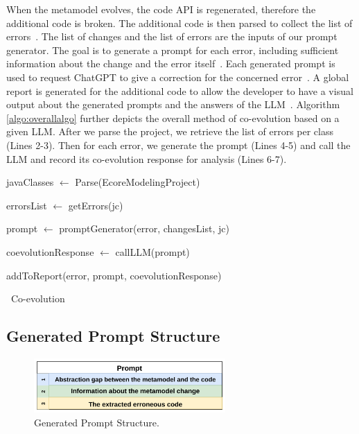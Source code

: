 When the metamodel evolves, the code API is regenerated, therefore the additional code is broken. The additional code is then parsed to collect the list of errors~. The list of changes and the list of errors are the inputs of our prompt generator. The goal is to generate a prompt for each error, including sufficient information about the change and the error itself~.
Each generated prompt is used to request ChatGPT to give a correction for the concerned error~. A global report is generated for the additional code to allow the developer to have a visual output about the generated prompts and the answers of the LLM~. Algorithm \ref{algo:overallalgo} further depicts the overall method of co-evolution based on a given LLM. After we parse the project, we retrieve the list of errors per class (Lines 2-3). Then for each error, we generate the prompt (Lines 4-5) and call the LLM and record its co-evolution response for analysis (Lines 6-7).


\begin{algorithm2e}[t]
	\small
	\SetAlgoLined
	javaClasses $\leftarrow$ Parse(EcoreModelingProject)
	
	{
		errorsList $\leftarrow $ getErrors(jc)
		
		{
			prompt $\leftarrow$ promptGenerator(error, changesList, jc)
			
			coevolutionResponse $\leftarrow$ callLLM(prompt)
			
			addToReport(error, prompt, coevolutionResponse)
		}
	}
	
	
	\caption{\LLM~Co-evolution}
	\label{algo:overallalgo}
\end{algorithm2e}

\subsection{Generated Prompt Structure}

\begin{figure}[t]
	\centering
	\includegraphics[width=0.65\textwidth]{./pics/chapter3pics/promptTemplate.png}
	\caption{Generated Prompt Structure.}
	\label{fig:promptstructure}
	\vspace{-5mm}
\end{figure}

